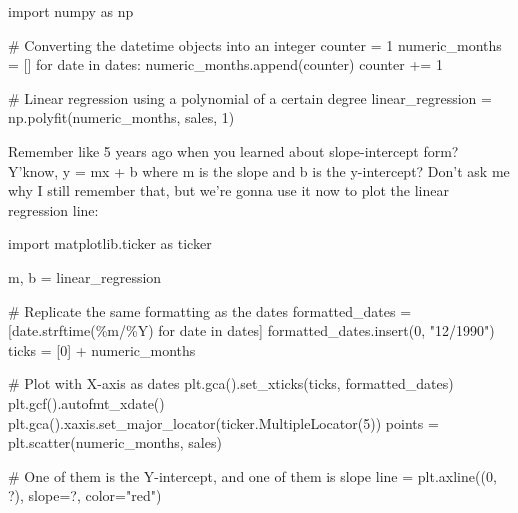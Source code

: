 \documentclass[
  letterpaper,
  DIV=11,
  numbers=noendperiod]{scrartcl}
\newenvironment{Shaded}{\begin{snugshade}}{\end{snugshade}}
\newcommand{\CommentTok}[1]{\textcolor[rgb]{0.37,0.37,0.37}{#1}}
\newcommand{\ControlFlowTok}[1]{\textcolor[rgb]{0.00,0.23,0.31}{#1}}
\newcommand{\DecValTok}[1]{\textcolor[rgb]{0.68,0.00,0.00}{#1}}
\newcommand{\ImportTok}[1]{\textcolor[rgb]{0.00,0.46,0.62}{#1}}
\newcommand{\KeywordTok}[1]{\textcolor[rgb]{0.00,0.23,0.31}{#1}}
\newcommand{\NormalTok}[1]{\textcolor[rgb]{0.00,0.23,0.31}{#1}}
\newcommand{\OperatorTok}[1]{\textcolor[rgb]{0.37,0.37,0.37}{#1}}
\newcommand{\StringTok}[1]{\textcolor[rgb]{0.13,0.47,0.30}{#1}}
\begin{document}
\begin{Shaded}
\begin{Highlighting}[]
\ImportTok{import}\NormalTok{ numpy }\ImportTok{as}\NormalTok{ np}

\CommentTok{\# Converting the datetime objects into an integer}
\NormalTok{counter }\OperatorTok{=} \DecValTok{1}
\NormalTok{numeric\_months }\OperatorTok{=}\NormalTok{ []}
\ControlFlowTok{for}\NormalTok{ date }\KeywordTok{in}\NormalTok{ dates:}
\NormalTok{    numeric\_months.append(counter)}
\NormalTok{    counter }\OperatorTok{+=} \DecValTok{1}

\CommentTok{\# Linear regression using a polynomial of a certain degree}
\NormalTok{linear\_regression }\OperatorTok{=}\NormalTok{ np.polyfit(numeric\_months, sales, }\DecValTok{1}\NormalTok{)}
\end{Highlighting}
\end{Shaded}

Remember like 5 years ago when you learned about slope-intercept form?
Y'know, y = mx + b where m is the slope and b is the y-intercept? Don't
ask me why I still remember that, but we're gonna use it now to plot the
linear regression line:

\begin{Shaded}
\begin{Highlighting}[]
\ImportTok{import}\NormalTok{ matplotlib.ticker }\ImportTok{as}\NormalTok{ ticker}

\NormalTok{m, b }\OperatorTok{=}\NormalTok{ linear\_regression}

\CommentTok{\# Replicate the same formatting as the dates}
\NormalTok{formatted\_dates }\OperatorTok{=}\NormalTok{ [date.strftime(}\StringTok{\textquotesingle{}\%m/\%Y\textquotesingle{}}\NormalTok{) }\ControlFlowTok{for}\NormalTok{ date }\KeywordTok{in}\NormalTok{ dates]}
\NormalTok{formatted\_dates.insert(}\DecValTok{0}\NormalTok{, }\StringTok{"12/1990"}\NormalTok{)}
\NormalTok{ticks }\OperatorTok{=}\NormalTok{ [}\DecValTok{0}\NormalTok{] }\OperatorTok{+}\NormalTok{ numeric\_months}

\CommentTok{\# Plot with X{-}axis as dates}
\NormalTok{plt.gca().set\_xticks(ticks, formatted\_dates)}
\NormalTok{plt.gcf().autofmt\_xdate()}
\NormalTok{plt.gca().xaxis.set\_major\_locator(ticker.MultipleLocator(}\DecValTok{5}\NormalTok{))}
\NormalTok{points }\OperatorTok{=}\NormalTok{ plt.scatter(numeric\_months, sales)}

\CommentTok{\# One of them is the Y{-}intercept, and one of them is slope}
\NormalTok{line }\OperatorTok{=}\NormalTok{ plt.axline((}\DecValTok{0}\NormalTok{, ?), slope}\OperatorTok{=}\NormalTok{?, color}\OperatorTok{=}\StringTok{"red"}\NormalTok{)}
\end{Highlighting}
\end{Shaded}
\end{document}
